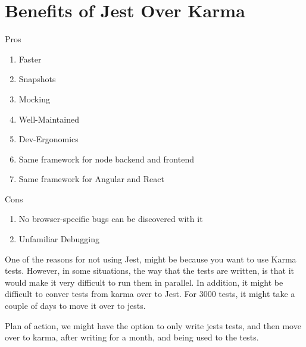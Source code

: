 \maketitle{}
\section{ Benefits of Jest Over Karma  }

Pros
\begin{enumerate}
  \item Faster
  \item Snapshots
  \item Mocking
  \item Well-Maintained
  \item Dev-Ergonomics
  \item Same framework for node backend and frontend
  \item Same framework for Angular and React
\end{enumerate}

Cons
\begin{enumerate}
  \item No browser-specific bugs can be discovered with it
  \item Unfamiliar Debugging
\end{enumerate}

One of the reasons for not using Jest, might be because you want to use Karma
tests. However, in some situations, the way that the tests are written, is that
it would make it very difficult to run them in parallel. In addition, it might
be difficult to conver tests from karma over to Jest. For 3000 tests,
it might take a couple of days to move it over to jests.

Plan of action, we might have the option to only write jests tests, and then
move over to karma, after writing for a month, and being used to the tests. 
